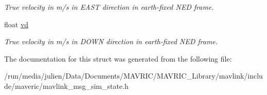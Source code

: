 \begin{DoxyCompactItemize}
\begin{DoxyCompactList}\small\item\em True velocity in m/s in E\+A\+S\+T direction in earth-\/fixed N\+E\+D frame. \end{DoxyCompactList}\item 
\hypertarget{struct____mavlink__sim__state__t_a057f5299b9dbad10fac6b7fce523aad7}{float \hyperlink{struct____mavlink__sim__state__t_a057f5299b9dbad10fac6b7fce523aad7}{vd}}\label{struct____mavlink__sim__state__t_a057f5299b9dbad10fac6b7fce523aad7}

\begin{DoxyCompactList}\small\item\em True velocity in m/s in D\+O\+W\+N direction in earth-\/fixed N\+E\+D frame. \end{DoxyCompactList}\end{DoxyCompactItemize}


The documentation for this struct was generated from the following file\+:\begin{DoxyCompactItemize}
\item 
/run/media/julien/\+Data/\+Documents/\+M\+A\+V\+R\+I\+C/\+M\+A\+V\+R\+I\+C\+\_\+\+Library/mavlink/include/maveric/mavlink\+\_\+msg\+\_\+sim\+\_\+state.\+h\end{DoxyCompactItemize}
